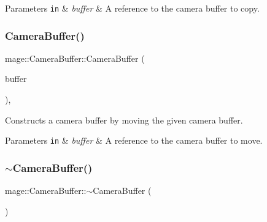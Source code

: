 \begin{DoxyParams}[1]{Parameters}
\mbox{\tt in}  & {\em buffer} & A reference to the camera buffer to copy. \\
\hline
\end{DoxyParams}
\hypertarget{structmage_1_1_camera_buffer_ade4f3fe1bd833a3f6ed43eadd0ffc241}{}\label{structmage_1_1_camera_buffer_ade4f3fe1bd833a3f6ed43eadd0ffc241} 
\subsubsection{\texorpdfstring{Camera\+Buffer()}{CameraBuffer()}\hspace{0.1cm}{\footnotesize\ttfamily [3/3]}}
{\footnotesize\ttfamily mage\+::\+Camera\+Buffer\+::\+Camera\+Buffer (\begin{DoxyParamCaption}\item[{\hyperlink{structmage_1_1_camera_buffer}{Camera\+Buffer} \&\&}]{buffer }\end{DoxyParamCaption})\hspace{0.3cm}{\ttfamily [default]}, {\ttfamily [noexcept]}}

Constructs a camera buffer by moving the given camera buffer.


\begin{DoxyParams}[1]{Parameters}
\mbox{\tt in}  & {\em buffer} & A reference to the camera buffer to move. \\
\hline
\end{DoxyParams}
\hypertarget{structmage_1_1_camera_buffer_a893ff21cfa017537ccd91dd816715701}{}\label{structmage_1_1_camera_buffer_a893ff21cfa017537ccd91dd816715701} 
\subsubsection{\texorpdfstring{$\sim$\+Camera\+Buffer()}{~CameraBuffer()}}
{\footnotesize\ttfamily mage\+::\+Camera\+Buffer\+::$\sim$\+Camera\+Buffer (\begin{DoxyParamCaption}{ }\end{DoxyParamCaption})\hspace{0.3cm}{\ttfamily [default]}}

